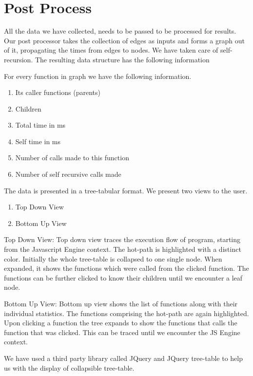 \documentclass[paper=a4, fontsize=11pt]{scrartcl} %
\numberwithin{equation}{section} %
\numberwithin{figure}{section} %
\numberwithin{table}{section} %
\begin{document}
\section{Post Process}

All the data we have collected, needs to be passed to be processed for results. Our post processor takes the collection of edges as inputs and forms a graph out of it, propagating the times from edges to nodes.
We have taken care of self-recursion. The resulting data structure has the following information

For every function in graph we have the following information.

\begin{enumerate}
\item Its caller functions (parents)
\item Children
\item Total time in ms
\item Self time in ms
\item Number of  calls made to this function
\item Number of self recursive calls made
\end{enumerate}

The data is presented in a tree-tabular format. We present two views to the user.

\begin{enumerate}
\item Top Down View
\item Bottom Up View
\end{enumerate}

Top Down View: Top down view traces the execution flow of program, starting from the Javascript Engine context. The hot-path is highlighted with a distinct color. Initially the whole tree-table is collapsed to one single node. When expanded, it shows the functions which were called from the clicked function. The functions can be further clicked to know their children until we encounter a leaf node.

Bottom Up View: Bottom up view shows the list of functions along with their individual statistics. The functions comprising the hot-path are again highlighted. Upon clicking a function the tree expands to show the functions that calls the function that was clicked. This can be traced until we encounter the JS Engine context.

We have used a third party library called JQuery and JQuery tree-table to help us with the display of collapsible tree-table.
\end{document}
